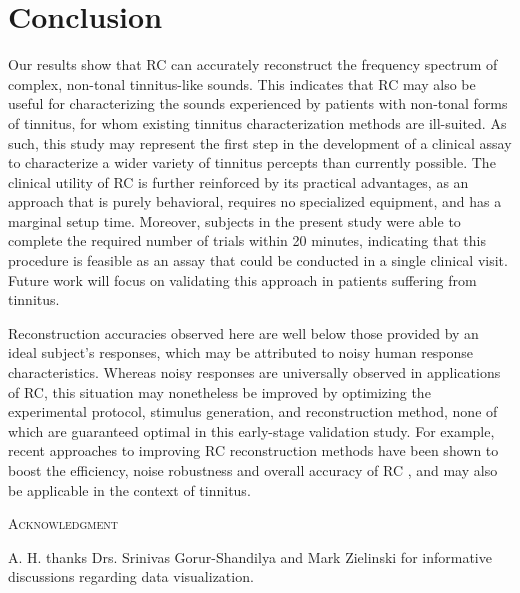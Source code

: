 \documentclass[journal]{IEEEtran}
\begin{document}
\section{Conclusion}

Our results show that RC can accurately reconstruct the frequency spectrum of complex, non-tonal tinnitus-like sounds.
This indicates that RC may also be useful for characterizing the sounds experienced by patients with non-tonal forms of tinnitus,
for whom existing tinnitus characterization methods are ill-suited.
As such, this study may represent the first step in the development of a clinical assay to characterize a wider variety of tinnitus percepts than currently possible.
The clinical utility of RC is further reinforced by its practical advantages,
as an approach that is purely behavioral, requires no specialized equipment, and has a marginal setup time.
Moreover, subjects in the present study were able to complete the required number of trials within 20 minutes,
indicating that this procedure is feasible as an assay that could be conducted in a single clinical visit.
Future work will focus on validating this approach in patients suffering from tinnitus.

Reconstruction accuracies observed here are well below those provided by an ideal subject's responses,
which may be attributed to noisy human response characteristics.
Whereas noisy responses are universally observed in applications of RC,
this situation may nonetheless be improved by optimizing the experimental protocol, stimulus generation, and reconstruction method,
none of which are guaranteed optimal in this early-stage validation study.
For example, recent approaches to improving RC reconstruction methods have been shown to boost the efficiency, noise robustness and overall accuracy of RC
\cite{comptonStimulusWhiteningImproves2022,roopCompressiveSensingApproach2021},
and may also be applicable in the context of tinnitus.

\textsc{Acknowledgment}
\par A. H. thanks Drs. Srinivas Gorur-Shandilya and Mark Zielinski for informative discussions regarding data visualization.
\end{document}
